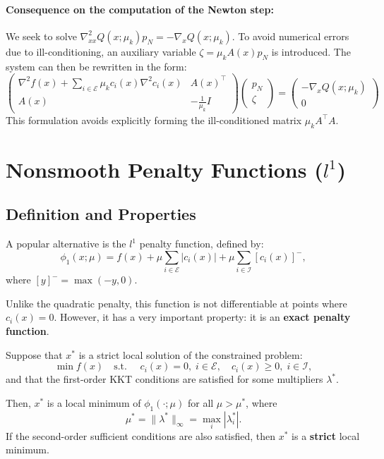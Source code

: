 \paragraph{Consequence on the computation of the Newton step:}
    We seek to solve $\nabla_{xx}^2 Q(x; \mu_k) p_N = -\nabla_x Q(x; \mu_k)$.
    To avoid numerical errors due to ill-conditioning, an auxiliary variable $\zeta = \mu_k A(x) p_N$ is introduced.
    The system can then be rewritten in the form:
    \[
    \begin{pmatrix}
        \nabla^2 f(x) + \sum_{i \in \mathcal{E}} \mu_k c_i(x) \nabla^2 c_i(x) & A(x)^\top \\
        A(x) & -\frac{1}{\mu_k} I
    \end{pmatrix}
    \begin{pmatrix}
        p_N \\
        \zeta
    \end{pmatrix}
    =
    \begin{pmatrix}
        -\nabla_x Q(x; \mu_k) \\
        0
    \end{pmatrix}
    \]
    This formulation avoids explicitly forming the ill-conditioned matrix $\mu_k A^\top A$.

\section{Nonsmooth Penalty Functions ($l^1$)}

\subsection{Definition and Properties}

A popular alternative is the $l^1$ penalty function, defined by:
\[
    \phi_1(x; \mu) = f(x) + \mu \sum_{i \in \mathcal{E}} |c_i(x)| + \mu \sum_{i \in \mathcal{I}} [c_i(x)]^-,
\]
where $[y]^- = \max(-y, 0)$.

Unlike the quadratic penalty, this function is not differentiable at points where $c_i(x) = 0$. However, it has a very important property: it is an \textbf{exact penalty function}.

\begin{theoreme}
    Suppose that $x^*$ is a strict local solution of the constrained problem:
    \[
        \min f(x) \quad \text{s.t. } \quad c_i(x) = 0, \; i \in \mathcal{E}, \quad c_i(x) \ge 0, \; i \in \mathcal{I},
    \]
    and that the first-order KKT conditions are satisfied for some multipliers $\lambda^*$.
    
    Then, $x^*$ is a local minimum of $\phi_1(\cdot; \mu)$ for all $\mu > \mu^*$, where
    \[
        \mu^* = \|\lambda^*\|_\infty = \max_i |\lambda_i^*|.
    \]
    If the second-order sufficient conditions are also satisfied, then $x^*$ is a \textbf{strict} local minimum.
\end{theoreme}

